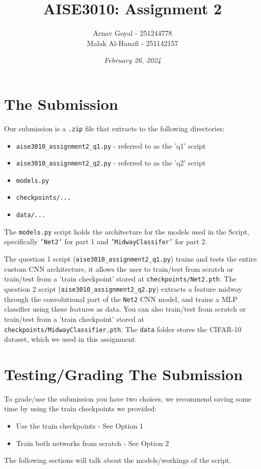 \documentclass[]{report}
\title{\textbf{AISE3010: Assignment 2}}
\date{\textit{February 26, 2024}}
\author{Arnav Goyal - 251244778 \\ Malak Al-Hanafi - 251142157}
\begin{document}
\maketitle
	
\section*{The Submission}
Our submission is a \texttt{.zip} file that extracts to the following directories:
\begin{itemize}
	\item \texttt{aise3010\_assignment2\_q1.py} - referred to as the 'q1' script
	\item \texttt{aise3010\_assignment2\_q2.py} - referred to as the 'q2' script
	\item \texttt{models.py}
	\item \texttt{checkpoints/...}
	\item \texttt{data/...}
\end{itemize}
The \texttt{models.py} script holds the architecture for the models used in the Script, specifically \texttt{'Net2'} for part 1 and \texttt{'MidwayClassifer'} for part 2.

The question 1 script (\texttt{aise3010\_assignment2\_q1.py}) trains and tests the entire custom CNN architecture, it allows the user to train/test from scratch or train/test from a 'train checkpoint' stored at \texttt{checkpoints/Net2.pth}. The question 2 script (\texttt{aise3010\_assignment2\_q2.py}) extracts a feature midway through the convolutional part of the \texttt{Net2} CNN model, and trains a MLP classifier using these features as data. You can also train/test from scratch or train/test from a 'train checkpoint' stored at \texttt{checkpoints/MidwayClassifier.pth}. The \texttt{data} folder stores the CIFAR-10 dataset, which we used in this assignment.

\section*{Testing/Grading The Submission}
To grade/use the submission you have two choices, we recommend saving some time by using the train checkpoints we provided:
\begin{itemize}
	\item Use the train checkpoints - See Option 1
	\item Train both networks from scratch - See Option 2
\end{itemize}
The following sections will talk about the models/workings of the script.
\end{document}
